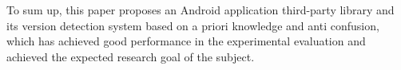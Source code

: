 \begin{digest}
To sum up, this paper proposes an Android application third-party library and its version detection system based on a priori knowledge and anti confusion, which has achieved good performance in the experimental evaluation and achieved the expected research goal of the subject.

\end{digest}
